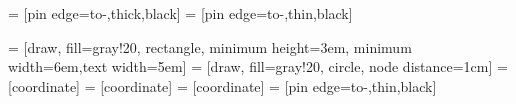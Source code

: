 \usetikzlibrary{shapes,arrows}

 = [pin edge={to-,thick,black}]
 = [pin edge={to-,thin,black}]

 = [draw, fill=gray!20, rectangle, minimum height=3em, minimum width=6em,text width=5em]
 = [draw, fill=gray!20, circle, node distance=1cm]
 = [coordinate]
 = [coordinate]
 = [coordinate]
 = [pin edge={to-,thin,black}]
